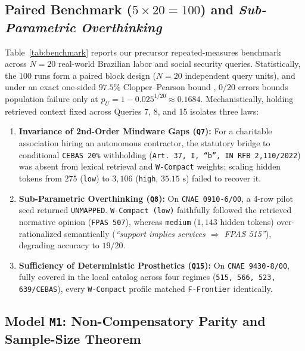 \documentclass[10pt,twocolumn]{article}
\begin{document}
\subsection{Paired Benchmark ($5 \times 20 = 100$) and \emph{Sub-Parametric Overthinking}}

Table~\ref{tab:benchmark} reports our precursor repeated-measures benchmark across $N=20$ real-world Brazilian labor and social security queries. Statistically, the $100$ runs form a paired block design ($N=20$ independent query units), and under an exact one-sided $97.5\%$ Clopper--Pearson bound \cite{clopper1934use}, $0/20$ errors bounds population failure only at $p_U = 1 - 0.025^{1/20} \approx 0.1684$. Mechanistically, holding retrieved context fixed across Queries 7, 8, and 15 isolates three laws:
\begin{enumerate}[leftmargin=*,nosep]
  \item \textbf{Invariance of 2nd-Order Mindware Gaps (\texttt{Q7}):} For a charitable association hiring an autonomous contractor, the statutory bridge to conditional \texttt{CEBAS 20\%} withholding (\texttt{Art.\ 37, I, ``b'', IN RFB 2,110/2022}) was absent from lexical retrieval and \texttt{W-Compact} weights; scaling hidden tokens from $275$ (\texttt{low}) to $3{,}106$ (\texttt{high}, $35.15\text{ s}$) failed to recover it.
  \item \textbf{Sub-Parametric Overthinking (\texttt{Q8}):} On \texttt{CNAE 0910-6/00}, a 4-row pilot seed returned \texttt{UNMAPPED}. \texttt{W-Compact (low)} faithfully followed the retrieved normative opinion (\texttt{FPAS 507}), whereas \texttt{medium} ($1{,}143$ hidden tokens) over-rationalized semantically (\emph{``support implies services $\Rightarrow$ FPAS 515''}), degrading accuracy to $19/20$.
  \item \textbf{Sufficiency of Deterministic Prosthetics (\texttt{Q15}):} On \texttt{CNAE 9430-8/00}, fully covered in the local catalog across four regimes (\texttt{515, 566, 523, 639/CEBAS}), every \texttt{W-Compact} profile matched \texttt{F-Frontier} identically.
\end{enumerate}

\subsection{Model \texttt{M1}: Non-Compensatory Parity and Sample-Size Theorem}
\end{document}
